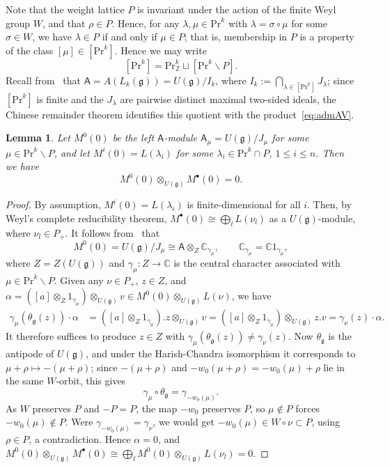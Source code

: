 \documentclass[12pt,a4paper,reqno]{amsart}
\numberwithin{equation}{section}
\newtheorem{lemma}[theorem]{Lemma}
\theoremstyle{definition}
\newcommand{\g}{\mathfrak{g}}
\newcommand{\C}{\mathbb{C}}
\newcommand{\Z}{\mathbb{Z}}
\def\Pr{\mathrm{Pr}}
\def\la{\lambda}
\def \al{\alpha}
\def\bs{\backslash}
\def\o{\otimes}
\def\ra{\rightarrow}
\def\A{\mathsf{A}}
\begin{document}
Note that the weight lattice $P$ is invariant under the action of the finite Weyl group $W$, and that $\rho\in P$. Hence, for any $\la,\mu\in \Pr^k$ with $\la=\sigma\circ\mu$ for some $\sigma\in W$, we have $\la\in P$ if and only if $\mu\in P$; that is, membership in $P$ is a property of the class $[\mu]\in[\Pr^k]$.
Hence we may write
\begin{equation}\label{eq:decofPrk}
[\Pr^k]=\Pr^k_\Z\sqcup [\Pr^k\bs P].
\end{equation}
Recall from~\cite[Theorem 3.4]{AvE} that $\A=A(L_k(\g))=U(\g)/I_k$, where $I_k:=\bigcap_{\la\in[\Pr^k]}J_\la$; since $[\Pr^k]$ is finite and the $J_\la$ are pairwise distinct maximal two-sided ideals, the Chinese remainder theorem identifies this quotient with the product~\eqref{eq:admAV}.
\begin{lemma}\label{lm:coinv0}
Let $M^0(0)$ be the left $\A$-module $\A_\mu=U(\g)/J_\mu$ for some $\mu\in \Pr^k\bs P$, and let $M^i(0)=L(\la_i)$ for some $\la_i\in \Pr^k\cap P$, $1\leq i\leq n$. Then we have
\[
 M^0(0)\o_{U(\g)} M^\bullet (0) =0.
\]
\end{lemma}
\begin{proof}
By assumption, $M^i(0)=L(\la_i)$ is finite-dimensional for all $i$. Then, by Weyl's complete reducibility theorem, $M^\bullet(0)\cong \bigoplus_l L(\nu_l)$ as a $U(\g)$-module, where $\nu_l\in P_+$. It follows from~\cite[eq.~(3.3)]{AvE} that
\[
M^0(0)=U(\g)/J_\mu\cong \A\o_{Z} \C_{\gamma_\mu},\qquad \C_{\gamma_\mu}=\C 1_{\gamma_\mu},
\]
where $Z=Z(U(\g))$ and $\gamma_\mu:Z\ra \C$ is the central character associated with $\mu\in \Pr^k\bs P$. Given any $\nu\in P_+$, $z\in Z$, and $\al=([a]\o_Z 1_{\gamma_\mu})\o_{U(\g)} v\in M^0(0)\o_{U(\g)}L(\nu)$, we have
\begin{align*}
\gamma_\mu(\theta_\g(z))\cdot \al&=([a]\o_Z 1_{\gamma_\mu}).z\o_{U(\g)} v=([a]\o_Z 1_{\gamma_\mu})\o_{U(\g)} z.v=\gamma_{\nu}(z)\cdot \al.
\end{align*}
It therefore suffices to produce $z\in Z$ with $\gamma_\mu(\theta_\g(z))\neq \gamma_\nu(z)$. Now $\theta_\g$ is the antipode of $U(\g)$, and under the Harish-Chandra isomorphism it corresponds to $\mu+\rho\mapsto -(\mu+\rho)$; since $-(\mu+\rho)$ and $-w_0(\mu+\rho)=-w_0(\mu)+\rho$ lie in the same $W$-orbit, this gives
\[
\gamma_\mu \circ \theta_\g = \gamma_{-w_0(\mu)}.
\]
As $W$ preserves $P$ and $-P=P$, the map $-w_0$ preserves $P$, so $\mu\notin P$ forces $-w_0(\mu)\notin P$. Were $\gamma_{-w_0(\mu)}=\gamma_\nu$, we would get $-w_0(\mu)\in W\circ \nu\subset P$, using $\rho\in P$, a contradiction. Hence $\al=0$, and $ M^0(0)\o_{U(\g)} M^\bullet (0)\cong  \bigoplus_l M^0(0)\o_{U(\g)} L(\nu_l)=0$.
\end{proof}
\end{document}
